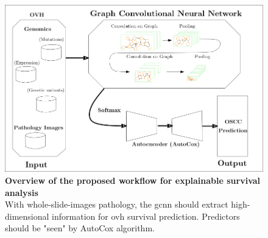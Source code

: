 \documentclass[12pt, a4paper]{article}
\newcommand{\bcaption}[2]{\caption{\textbf{#1} #2}}
\begin{document}
\begin{figure}[hp]
\centering
\includegraphics[width=14cm]{GCNN_survival_AutoCox.png}
\bcaption{Overview of the proposed workflow for explainable survival analysis}
{\\
With whole-slide-images pathology, the \acrfull{gcnn} should extract high-dimensional information for \acrshort{ovh} survival prediction. Predictors should be "seen" by AutoCox algorithm.}
\label{fig:GCNN}
\end{figure}




\end{document}
